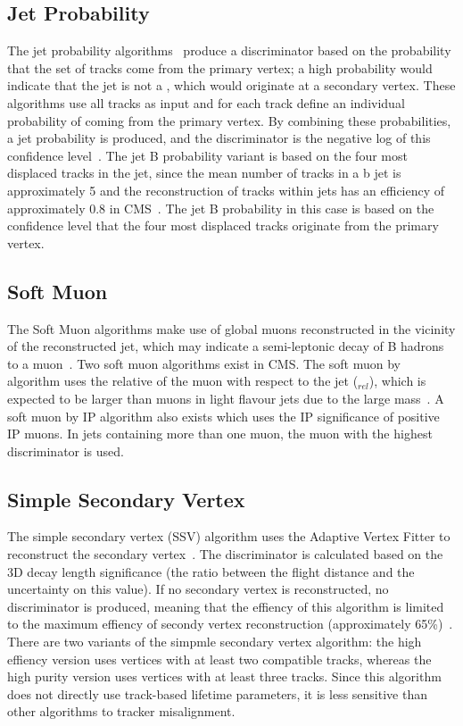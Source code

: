 \subsection*{Jet Probability}
\label{ss:jet_probability}
The jet probability algorithms~\cite{CMS-PAS-BTV-09-001} produce a discriminator based on the probability that
the set of tracks come from the primary vertex; a high probability would indicate that the jet is not a \bjet,
which would originate at a secondary vertex. These algorithms use all tracks as input and for each track
define an individual probability of coming from the primary vertex. By combining these probabilities, a jet
probability is produced, and the discriminator is the negative log of this confidence
level~\cite{CMS-AN-2005-041}. The jet B probability variant is based on the four most displaced tracks in the
jet, since the mean number of tracks in a b jet is approximately 5 and the reconstruction of tracks within
jets has an efficiency of approximately 0.8 in CMS~\cite{CMS-PAS-BTV-09-001}. The jet B probability in this
case is based on the confidence level that the four most displaced tracks originate from the primary vertex.

\subsection*{Soft Muon}
\label{ss:soft_muon}
The Soft Muon algorithms make use of global muons reconstructed in the vicinity of the reconstructed jet,
which may indicate a semi-leptonic decay of B hadrons to a muon~\cite{CMS-AN-2009-085}. Two soft muon
algorithms exist in CMS. The soft muon by \pt algorithm uses the relative \pt of the muon with respect to the
jet (\pt$_{rel}$), which is expected to be larger than muons in light flavour jets due to the large \bquark
mass~\cite{CMS-AN-2009-085, Ferro:2012tg}. A soft muon by IP algorithm also exists which uses the IP
significance of positive IP muons. In jets containing more than one muon, the muon with the highest
discriminator is used.

\subsection*{Simple Secondary Vertex}
\label{ss:simple_secondary_vertex}
The simple secondary vertex (SSV) algorithm uses the Adaptive Vertex Fitter to reconstruct the secondary
vertex~\cite{Frühwirth:1027031}. The discriminator is calculated based on the 3D decay length significance
(the ratio between the flight distance and the uncertainty on this value). If no secondary vertex is reconstructed, no discriminator is produced, meaning
that the effiency of this algorithm is limited to the maximum effiency of secondy vertex reconstruction
(approximately 65\%)~\cite{Chatrchyan:2012jua}. There are two variants of the simpmle secondary vertex algorithm: the
high effiency version uses vertices with at least two compatible tracks, whereas the high purity version uses
vertices with at least three tracks. Since this algorithm does not directly use track-based lifetime
parameters, it is less sensitive than other algorithms to tracker misalignment.

